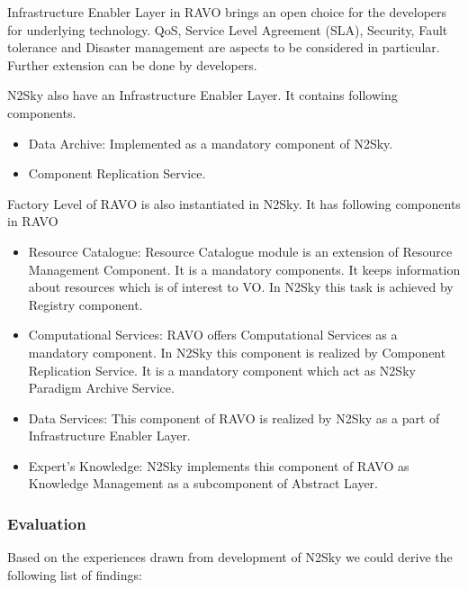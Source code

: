 \documentclass[]{article}
\begin{document}
Infrastructure Enabler Layer in RAVO brings an open choice for the developers for underlying technology. QoS, Service Level Agreement (SLA), Security, Fault tolerance and Disaster management are  aspects to be considered in particular. Further extension can be done by developers.

N2Sky also have an Infrastructure Enabler Layer. It contains following components.
\begin{itemize}
\item Data Archive: Implemented as a mandatory component of N2Sky.
\item Component Replication Service.
\end{itemize}

Factory Level of RAVO is also instantiated in N2Sky. It has following components in RAVO
\begin{itemize}
\item Resource Catalogue: Resource Catalogue module is an extension of Resource Management Component. It is a mandatory components. It keeps information about resources which is of interest to VO. In N2Sky this task is achieved by Registry component.
\item Computational Services: RAVO offers Computational Services as a mandatory component. In N2Sky this component is realized by Component Replication Service. It is a mandatory component which act as N2Sky Paradigm Archive Service.
\item Data Services: This component of RAVO is realized by N2Sky as a part of Infrastructure Enabler Layer.
\item Expert's Knowledge: N2Sky implements this component of RAVO as Knowledge Management as a subcomponent of Abstract Layer.
\end{itemize}


\subsubsection{Evaluation}\label{sec:evaluation}

Based on the experiences drawn from development of N2Sky we could derive the following list of findings:
\end{document}
